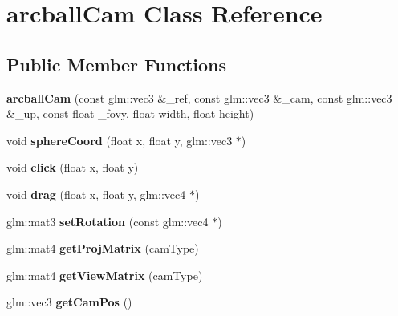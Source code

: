 \hypertarget{classarcball_cam}{\section{arcball\-Cam Class Reference}
\label{classarcball_cam}
}
\subsection*{Public Member Functions}
\begin{DoxyCompactItemize}
\item 
\hypertarget{classarcball_cam_a4f5cc911918dd99f4b691b08e60ec5c3}{{\bfseries arcball\-Cam} (const glm\-::vec3 \&\-\_\-ref, const glm\-::vec3 \&\-\_\-cam, const glm\-::vec3 \&\-\_\-up, const float \-\_\-fovy, float width, float height)}\label{classarcball_cam_a4f5cc911918dd99f4b691b08e60ec5c3}

\item 
\hypertarget{classarcball_cam_aaf5217b7444b5a3ed1a2e20173881059}{void {\bfseries sphere\-Coord} (float x, float y, glm\-::vec3 $\ast$)}\label{classarcball_cam_aaf5217b7444b5a3ed1a2e20173881059}

\item 
\hypertarget{classarcball_cam_a5b3ed2d71f2c446dfea4bea79d65297d}{void {\bfseries click} (float x, float y)}\label{classarcball_cam_a5b3ed2d71f2c446dfea4bea79d65297d}

\item 
\hypertarget{classarcball_cam_a14a44ad733d3abad40944e20da7660b4}{void {\bfseries drag} (float x, float y, glm\-::vec4 $\ast$)}\label{classarcball_cam_a14a44ad733d3abad40944e20da7660b4}

\item 
\hypertarget{classarcball_cam_ad1e270038b117fd55c691907bea3799f}{glm\-::mat3 {\bfseries set\-Rotation} (const glm\-::vec4 $\ast$)}\label{classarcball_cam_ad1e270038b117fd55c691907bea3799f}

\item 
\hypertarget{classarcball_cam_a87998760131dc20d0f8f618cec207adc}{glm\-::mat4 {\bfseries get\-Proj\-Matrix} (cam\-Type)}\label{classarcball_cam_a87998760131dc20d0f8f618cec207adc}

\item 
\hypertarget{classarcball_cam_a481dd7def6b937e6e628e7150d33f597}{glm\-::mat4 {\bfseries get\-View\-Matrix} (cam\-Type)}\label{classarcball_cam_a481dd7def6b937e6e628e7150d33f597}

\item 
\hypertarget{classarcball_cam_aee30b3f619e502d7e85b9ab80eace0c4}{glm\-::vec3 {\bfseries get\-Cam\-Pos} ()}\label{classarcball_cam_aee30b3f619e502d7e85b9ab80eace0c4}


\end{DoxyCompactItemize}
